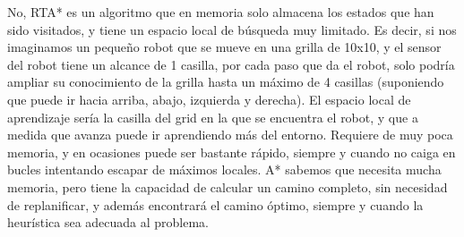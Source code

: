 \documentclass{article}
\begin{document}
\vspace{5mm}
\newline No, RTA* es un algoritmo que en memoria solo almacena los estados que han sido visitados, y tiene un espacio local de búsqueda muy limitado.
Es decir, si nos imaginamos un pequeño robot que se mueve en una grilla de 10x10, y el sensor del robot tiene un alcance de 1 casilla, 
por cada paso que da el robot, solo podría ampliar su conocimiento de la grilla hasta un máximo de 4 casillas (suponiendo que puede ir hacia arriba, abajo, 
izquierda y derecha). El espacio local de aprendizaje sería la casilla del grid en la que se encuentra el robot, y que a medida que avanza puede ir 
aprendiendo más del entorno. Requiere de muy poca memoria, y en ocasiones puede ser bastante rápido, siempre y cuando no caiga en bucles intentando escapar de 
máximos locales.
A* sabemos que necesita mucha memoria, pero tiene la capacidad de calcular un camino completo, sin necesidad de replanificar, y además encontrará el camino óptimo,
siempre y cuando la heurística sea adecuada al problema.
\end{document}
